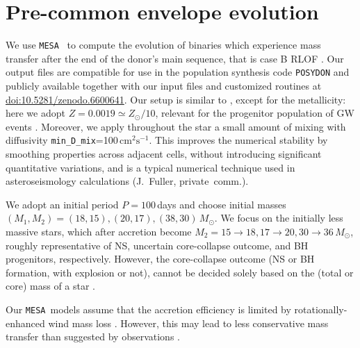 \documentclass[twocolumn,twocolappendix,trackchanges]{aastex63}
\newcommand{\code}[1]{\texttt{#1}}
\newcommand{\mesa}{\code{MESA}}
\begin{document}
\section{Pre-common envelope evolution}
\label{sec:methods}

We use \mesa\ \citep[version 15140,][]{paxton:2011, paxton:2013,
  paxton:2015, paxton:2018, paxton:2019} to compute the evolution of
binaries which experience mass transfer after the end of the donor's
main sequence, that is case B RLOF
\citep[][]{kippenhahn:1967}. Our output files are compatible for
use in the population synthesis code \code{POSYDON}
\citep{fragos:2022} and publicly available together with our input
files and customized routines at
\href{https://zenodo.org/deposit/6600641}{doi:10.5281/zenodo.6600641}.
Our setup is similar to \cite{renzo:2021zoph}, except for the
metallicity: here we adopt $Z=0.0019\simeq Z_\odot/10$, relevant for
the progenitor population of GW events \citep[e.g.,][]{vanson:2021}.
Moreover, we apply throughout the star a small amount of mixing with
diffusivity \texttt{min\_D\_mix}=100\,$\mathrm{cm^2 s^{-1}}$. This
improves the numerical stability by smoothing properties across
adjacent cells, without introducing significant quantitative
variations, and is a typical numerical technique used in
asteroseismology calculations (J.~Fuller, private~comm.).

We adopt an initial period $P=100$\,days and choose initial masses
$(M_{1}, M_{2}) = (18, 15), (20, 17), (38, 30)\,M_\odot$. We focus on
the initially less massive stars, which after accretion become
$M_2=15\rightarrow 18, 17\rightarrow 20, 30\rightarrow 36\,M_\odot$,
roughly representative of NS, uncertain core-collapse outcome, and BH
progenitors, respectively. However, the core-collapse outcome (NS or
BH formation, with explosion or not), cannot be decided solely based
on the (total or core) mass of a star \citep[e.g.,][]{oconnor:11,
  farmer:16, patton:2020, zapartas:21b, patton:22}.

Our \mesa\ models assume that the accretion efficiency is limited by
rotationally-enhanced wind mass loss \citep[e.g.,][]{sravan:2019,
  wang:2020, renzo:2021zoph, sen:2022}. However, this may lead to less
conservative mass transfer than suggested by observations
\citep[e.g.,][]{wang:2021a,renzo:2021zoph}.
\end{document}

